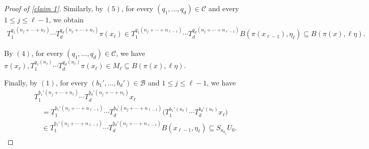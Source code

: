 \documentclass[10pt,a4paper]{amsart}
\newcommand{\cB}{{\mathcal B}}
\newcommand{\cC}{{\mathcal C}}
\begin{document}
\begin{proof}[Proof of \cref{claim 1}]
Similarly, by $(5)$, for every $(q_1,\dots,q_d)\in\cC$ and every $1\leq j\leq \ell-1$, we obtain\begin{align*}
    T_1^{q_1(n_j+\cdots+n_\ell)}\cdots  T_d^{q_d(n_j+\cdots+n_\ell)}\pi(x_\ell) \in T_1^{q_1(n_j+\cdots+n_{\ell-1})} \cdots T_d^{q_d(n_j+\cdots+n_{\ell-1})}B(\pi(x_{\ell-1}),\eta_\ell) \subseteq B(\pi(x),\ell\eta).
\end{align*}

By $(4)$, for every $(q_1,\dots,q_d)\in \cC$, we have $\pi(x_\ell),T_1^{q_1(n_\ell)}\cdots T_d^{q_d(n_\ell)}\pi(x_\ell)\in M_\ell \subseteq B(\pi(x),\ell\eta)$.

Finally, by $(1)$, for every $(b_1',\dots,b_d')\in \cB$ and
$1\leq j \leq \ell-1$, we have\begin{align*}
&T_1^{b_{1}'(n_j+\cdots+n_\ell)}\cdots
 T_d^{b_{d}'(n_j+\cdots+n_\ell)}x_\ell       \\
&\quad =
T_1^{b_{1}'(n_j+\cdots+n_{\ell-1})}\cdots
T_d^{b_{d}'(n_j+\cdots+n_{\ell-1})} 
\big(T_1^{b_1'(n_\ell)}\cdots T_d^{b_d'(n_\ell)}x_\ell\big)                                        \\
&\quad \in
T_1^{b_1'(n_j+\cdots+n_{\ell-1})}\cdots
T_d^{b_d'(n_j+\cdots+n_{\ell-1})}
B(x_{\ell-1},\eta_\ell)   \subseteq S_{a_{k_j}}U_0 .
\end{align*}

    
\end{proof}
\end{document}
